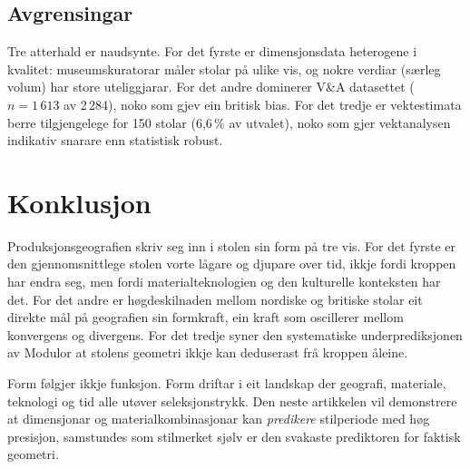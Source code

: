 \documentclass[10pt, a4paper, twocolumn]{article}
\begin{document}
\subsection{Avgrensingar}

Tre atterhald er naudsynte. For det fyrste er dimensjonsdata heterogene i kvalitet: museumskuratorar måler stolar på ulike vis, og nokre verdiar (særleg volum) har store uteliggjarar. For det andre dominerer V\&A datasettet ($n = 1\,613$ av 2\,284), noko som gjev ein britisk bias. For det tredje er vektestimata berre tilgjengelege for 150 stolar (6,6\,\% av utvalet), noko som gjer vektanalysen indikativ snarare enn statistisk robust.


\section{Konklusjon}

Produksjonsgeografien skriv seg inn i stolen sin form på tre vis. For det fyrste er den gjennomsnittlege stolen vorte lågare og djupare over tid, ikkje fordi kroppen har endra seg, men fordi materialteknologien og den kulturelle konteksten har det. For det andre er høgdeskilnaden mellom nordiske og britiske stolar eit direkte mål på geografien sin formkraft, ein kraft som oscillerer mellom konvergens og divergens. For det tredje syner den systematiske underprediksjonen av Modulor at stolens geometri ikkje kan deduserast frå kroppen åleine.

Form følgjer ikkje funksjon. Form driftar i eit landskap der geografi, materiale, teknologi og tid alle utøver seleksjonstrykk. Den neste artikkelen vil demonstrere at dimensjonar og materialkombinasjonar kan \emph{predikere} stilperiode med høg presisjon, samstundes som stilmerket sjølv er den svakaste prediktoren for faktisk geometri.


\newpage
\onecolumn


\end{document}
